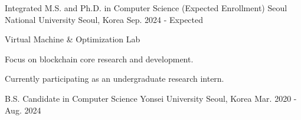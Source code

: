 


\begin{cventries}


\cventry
{Integrated M.S. and Ph.D. in Computer Science (Expected Enrollment)} %
{Seoul National University} %
{Seoul, Korea} %
{Sep. 2024 - Expected} %
{ %
\begin{cvitems}
\item {Virtual Machine \& Optimization Lab}
\item {Focus on blockchain core research and development.}
\item {Currently participating as an undergraduate research intern.}
\end{cvitems}
}

\cventry
{B.S. Candidate in Computer Science} %
{Yonsei University} %
{Seoul, Korea} %
{Mar. 2020 - Aug. 2024} %
{ %
\begin{cvitems}
\item {}
\end{cvitems}
}


\end{cventries}